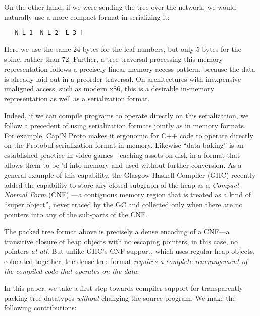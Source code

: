 \documentclass[preprint,10pt,nocopyrightspace,nonatbib]{./bibs/sigplanconf}
\begin{document}
On the other hand, if we were sending the tree over the network, we would
naturally use a more compact format in serializing it:

\begin{verbatim}
  [N L 1  N L 2  L 3 ]
\end{verbatim}

Here we use the same 24 bytes for the leaf numbers, but only 5 bytes for the
spine, rather than 72.  Further, a tree traversal processing this memory
representation follows a precisely linear memory access pattern, because the
data is already laid out in a preorder traversal.
%
On architectures with inexpensive unaligned access, such as modern x86, this is
a desirable in-memory representation as well as a serialization format.

Indeed, if we can compile programs to operate directly on this serialization, we
follow a precedent of using serialization formats jointly as in memory formats.
For example, Cap'N Proto \cite{capnproto} makes it ergonomic for C++ code to operate directly
on the Protobuf serialization format in memory.  Likewise ``data baking''
\cite{data-baking} is an established practice in video games---caching assets on
disk in a format that allows them to be 'd into memory and used
without further conversion.  As a general example of this capability, the
Glasgow Haskell Compiler (GHC) recently added the capability to store any closed
subgraph of the heap as a {\em Compact Normal Form} (CNF) \cite{cnf-icfp15}---a
contiguous memory region that is treated as a kind of ``super object'', never
traced by the GC and collected only when there are no pointers into any of the
sub-parts of the CNF.

The packed tree format above is precisely a dense encoding of a CNF---a
transitive closure of heap objects with no escaping pointers, in this case, no
pointers {\em at all}.  But unlike GHC's CNF support, which uses regular heap
objects, colocated together, the dense tree format {\em requires a complete
rearrangement of the compiled code that operates on the data}.


In this paper, we take a first step towards compiler support for transparently
packing tree datatypes {\em without} changing the source program.  We make the
following contributions:
\end{document}
